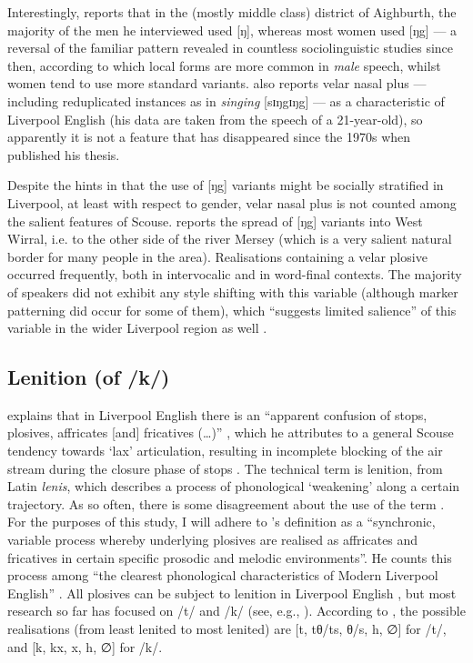 Interestingly, \citeauthor{knowles1973} reports that in the (mostly middle class) district of Aighburth, the majority of the men he interviewed used [ŋ], whereas most women used [ŋg] \citeyearpar[cf.][295]{knowles1973} --- a reversal of the familiar pattern revealed in countless sociolinguistic studies since then, according to which local forms are more common in \emph{male} speech, whilst women tend to use more standard variants.
\citet[352]{watson2007} also reports velar nasal plus --- including reduplicated instances as in \emph{singing} [sɪŋgɪŋg] --- as a characteristic of Liverpool English (his data are taken from the speech of a 21-year-old), so apparently it is not a feature that has disappeared since the 1970s when \citeauthor{knowles1973} published his thesis.

Despite the hints in \textcite{knowles1973} that the use of [ŋg] variants might be socially stratified in Liverpool, at least with respect to gender, velar nasal plus is not counted among the salient features of Scouse.
\textcite[98]{newbrook1999} reports the spread of [ŋg] variants into West Wirral, i.e. to the other side of the river Mersey (which is a very salient natural border for many people in the area).
Realisations containing a velar plosive occurred frequently, both in intervocalic and in word-final contexts.
The majority of speakers did not exhibit any style shifting with this variable (although marker patterning did occur for some of them), which ``suggests limited salience'' of this variable in the wider Liverpool region as well \parencite[98]{newbrook1999}.

		\subsection{Lenition (of /k/)}\label{sec.var.con.len}

\citeauthor{knowles1973} explains that in Liverpool English there is an ``apparent confusion of stops, plosives, affricates [and] fricatives (\ldots)'' \citeyearpar[251]{knowles1973}, which he attributes to a general Scouse tendency towards `lax' articulation, resulting in incomplete blocking of the air stream during the closure phase of stops \citeyearpar[cf.][107]{knowles1973}.
The technical term is lenition, from Latin \emph{lenis}, which describes a process of phonological `weakening' along a certain trajectory.
As so often, there is some disagreement about the use of the term \citep[cf.[196]{watson2002}. For the purposes of this study, I will adhere to \citeauthor{honeybone2007}'s definition as a ``synchronic, variable process whereby underlying plosives are realised as affricates and fricatives in certain specific prosodic and melodic environments''.
He counts this process among ``the clearest phonological characteristics of Modern Liverpool English'' \citeyearpar[129]{honeybone2007}.
All plosives can be subject to lenition in Liverpool English \citep[cf.][236]{honeybone2001}, but most research so far has focused on /t/ and /k/ (see, e.g., \citealt{honeybone2001, sangster2001, watson2002, watson2006}).
According to \textcite[236]{honeybone2001}, the possible realisations (from least lenited to most lenited) are [t, tθ/ts, θ/s, h, ∅] for /t/, and [k, kx, x, h, ∅] for /k/.

